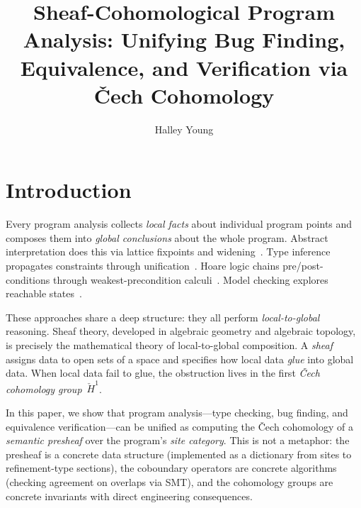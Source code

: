 \documentclass[acmsmall,screen]{acmart}
\title{Sheaf-Cohomological Program Analysis:
  Unifying Bug Finding, Equivalence, and Verification
  via \v{C}ech Cohomology}
\author{Halley Young}
\affiliation{%
  \institution{Microsoft Research}
  \city{Redmond}
  \state{WA}
  \country{USA}
}
\theoremstyle{remark}
\newcommand{\Hc}[1]{\check{H}^{#1}}
\begin{document}
\maketitle

\section{Introduction}\label{sec:intro}

Every program analysis collects \emph{local facts} about individual
program points and composes them into \emph{global conclusions} about
the whole program.  Abstract interpretation does this via lattice
fixpoints and widening~\cite{CousotCousot77}.  Type inference propagates
constraints through unification~\cite{HindleyMilner}.  Hoare logic
chains pre/post-conditions through weakest-precondition
calculi~\cite{Hoare69}.  Model checking explores reachable
states~\cite{ClarkeEmersonSistla86}.

These approaches share a deep structure: they all perform
\emph{local-to-global} reasoning.  Sheaf theory, developed in algebraic
geometry and algebraic topology, is precisely the mathematical theory of
local-to-global composition.  A \emph{sheaf} assigns data to open sets
of a space and specifies how local data \emph{glue} into global data.
When local data fail to glue, the obstruction lives in the first
\emph{\v{C}ech cohomology group}~$\Hc{1}$.

In this paper, we show that program analysis---type checking, bug
finding, and equivalence verification---can be unified as computing the
\v{C}ech cohomology of a \emph{semantic presheaf} over the program's
\emph{site category}.  This is not a metaphor: the presheaf is a
concrete data structure (implemented as a dictionary from sites to
refinement-type sections), the coboundary operators are concrete
algorithms (checking agreement on overlaps via SMT), and the cohomology
groups are concrete invariants with direct engineering consequences.
\end{document}
